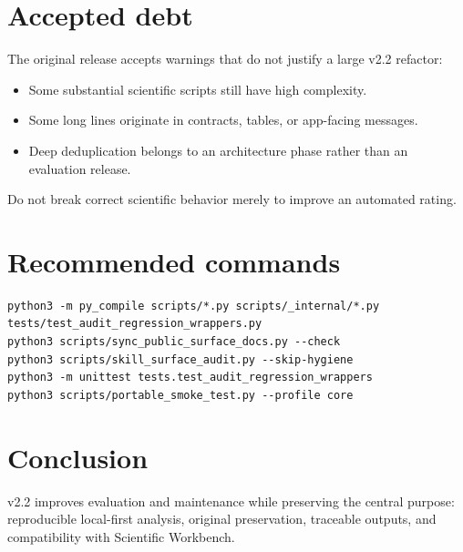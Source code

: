 \documentclass[11pt,a4paper]{article}
\begin{document}
\section{Accepted debt}
The original release accepts warnings that do not justify a large v2.2 refactor:
\begin{itemize}[leftmargin=1.5em]
\item Some substantial scientific scripts still have high complexity.
\item Some long lines originate in contracts, tables, or app-facing messages.
\item Deep deduplication belongs to an architecture phase rather than an evaluation release.
\end{itemize}
Do not break correct scientific behavior merely to improve an automated rating.

\section{Recommended commands}
\begin{lstlisting}[style=promptstyle]
python3 -m py_compile scripts/*.py scripts/_internal/*.py tests/test_audit_regression_wrappers.py
python3 scripts/sync_public_surface_docs.py --check
python3 scripts/skill_surface_audit.py --skip-hygiene
python3 -m unittest tests.test_audit_regression_wrappers
python3 scripts/portable_smoke_test.py --profile core
\end{lstlisting}

\section{Conclusion}
v2.2 improves evaluation and maintenance while preserving the central purpose:
reproducible local-first analysis, original preservation, traceable outputs,
and compatibility with Scientific Workbench.
\end{document}

